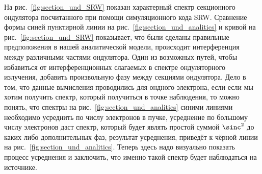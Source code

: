 На рис.~\ref{fig:section_und_SRW} показан характерный спектр секционного ондулятора посчитанного при помощи симуляционного кода SRW. Сравнение формы синей пунктирной линии на рис.~\ref{fig:section_und_analitics} и кривой на рис.~\ref{fig:section_und_SRW} показывает, что были сделаны правильные предположения в нашей аналитической модели, происходит интерференция между различными частями ондулятора.
Один из возможных путей, чтобы избавиться от интерференционных слагаемых в спектре ондуляторного излучения, добавить произвольную фазу между секциями ондулятора. Дело в том, что данные вычисления проводились для ондного электрона, если если мы хотим получить спектр, который получиться в точке наблюдения, то можно понять, что спектры на рис.~\ref{fig:section_und_analitics} синими линиями необходимо усреднить по числу электронов в пучке, усреднение по большому числу электронов даст спектр, который будет являть простой суммой $\sinc^2$ до каких либо дополнительных фаз, результат усреднения, приведёт к чёрной линии на рис.~\ref{fig:section_und_analitics}. Теперь здесь надо визуально показать процесс усреднения и заключить, что именно такой спектр будет наблюдаться на источнике.
